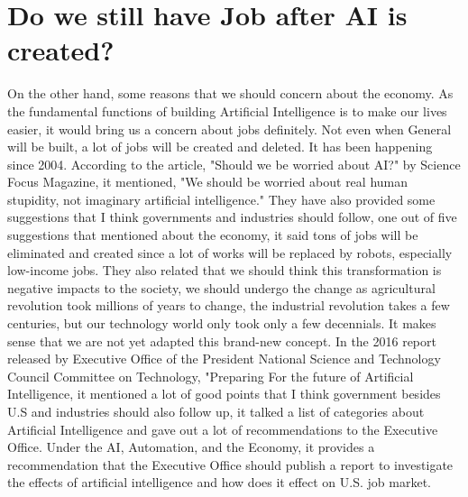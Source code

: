 \documentclass[12pt]{article}
\begin{document}
\section{Do we still have Job after AI is created?}
On the other hand, some reasons that we should concern about the economy. As the fundamental functions of building Artificial Intelligence is to make our lives easier, it would bring us a concern about jobs definitely. Not even when General will be built, a lot of jobs will be created and deleted. It has been happening since 2004. According to the article, "Should we be worried about AI?" by Science Focus Magazine, it mentioned, "We should be worried about real human stupidity, not imaginary artificial intelligence." They have also provided some suggestions that I think governments and industries should follow, one out of five suggestions that mentioned about the economy, it said tons of jobs will be eliminated and created since a lot of works will be replaced by robots, especially low-income jobs\cite{sciencefocus}. They also related that we should think this transformation is negative impacts to the society, we should undergo the change as agricultural revolution took millions of years to change, the industrial revolution takes a few centuries, but our technology world only took only a few decennials\cite{sciencefocus}. It makes sense that we are not yet adapted this brand-new concept. In the 2016 report released by Executive Office of the President National Science and Technology Council Committee on Technology, "Preparing For the future of Artificial Intelligence, it mentioned a lot of good points that I think government besides U.S and industries should also follow up, it talked a list of categories about Artificial Intelligence and gave out a lot of recommendations to the Executive Office. Under the AI, Automation, and the Economy, it provides a recommendation that the Executive Office should publish a report to investigate the effects of artificial intelligence and how does it effect on U.S. job market\cite{2016Report}. 
\end{document}
